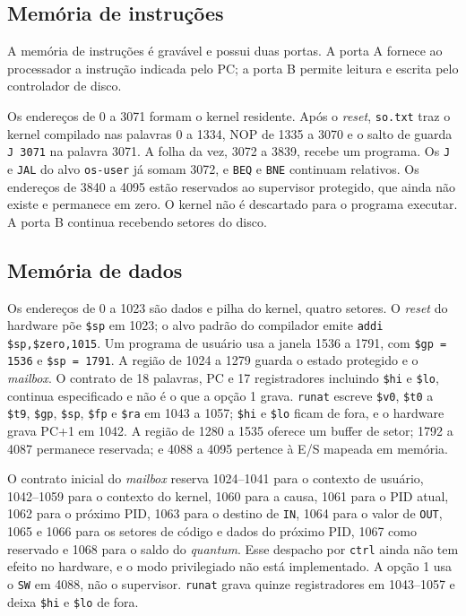 \documentclass[
    12pt,
    openright,
    a4paper,
    english,
    brazilian
]{abntex2}
\begin{document}
\subsection{Memória de instruções}

A memória de instruções é gravável e possui duas portas. A porta A fornece ao processador a instrução indicada pelo PC; a porta B permite leitura e escrita pelo controlador de disco.

Os endereços de 0 a 3071 formam o kernel residente. Após o \emph{reset}, \texttt{so.txt} traz o kernel compilado nas palavras 0 a 1334, NOP de 1335 a 3070 e o salto de guarda \texttt{J 3071} na palavra 3071. A folha da vez, 3072 a 3839, recebe um programa. Os \texttt{J} e \texttt{JAL} do alvo \texttt{os-user} já somam 3072, e \texttt{BEQ} e \texttt{BNE} continuam relativos. Os endereços de 3840 a 4095 estão reservados ao supervisor protegido, que ainda não existe e permanece em zero. O kernel não é descartado para o programa executar. A porta B continua recebendo setores do disco.

\subsection{Memória de dados}

Os endereços de 0 a 1023 são dados e pilha do kernel, quatro setores. O \emph{reset} do hardware põe \texttt{\$sp} em 1023; o alvo padrão do compilador emite \texttt{addi \$sp,\$zero,1015}. Um programa de usuário usa a janela 1536 a 1791, com \texttt{\$gp = 1536} e \texttt{\$sp = 1791}. A região de 1024 a 1279 guarda o estado protegido e o \emph{mailbox}. O contrato de 18 palavras, PC e 17 registradores incluindo \texttt{\$hi} e \texttt{\$lo}, continua especificado e não é o que a opção 1 grava. \texttt{runat} escreve \texttt{\$v0}, \texttt{\$t0} a \texttt{\$t9}, \texttt{\$gp}, \texttt{\$sp}, \texttt{\$fp} e \texttt{\$ra} em 1043 a 1057; \texttt{\$hi} e \texttt{\$lo} ficam de fora, e o hardware grava PC+1 em 1042. A região de 1280 a 1535 oferece um buffer de setor; 1792 a 4087 permanece reservada; e 4088 a 4095 pertence à E/S mapeada em memória.

O contrato inicial do \emph{mailbox} reserva 1024--1041 para o contexto de usuário, 1042--1059 para o contexto do kernel, 1060 para a causa, 1061 para o PID atual, 1062 para o próximo PID, 1063 para o destino de \texttt{IN}, 1064 para o valor de \texttt{OUT}, 1065 e 1066 para os setores de código e dados do próximo PID, 1067 como reservado e 1068 para o saldo do \emph{quantum}. Esse despacho por \texttt{ctrl} ainda não tem efeito no hardware, e o modo privilegiado não está implementado. A opção 1 usa o \texttt{SW} em 4088, não o supervisor. \texttt{runat} grava quinze registradores em 1043--1057 e deixa \texttt{\$hi} e \texttt{\$lo} de fora.
\end{document}
